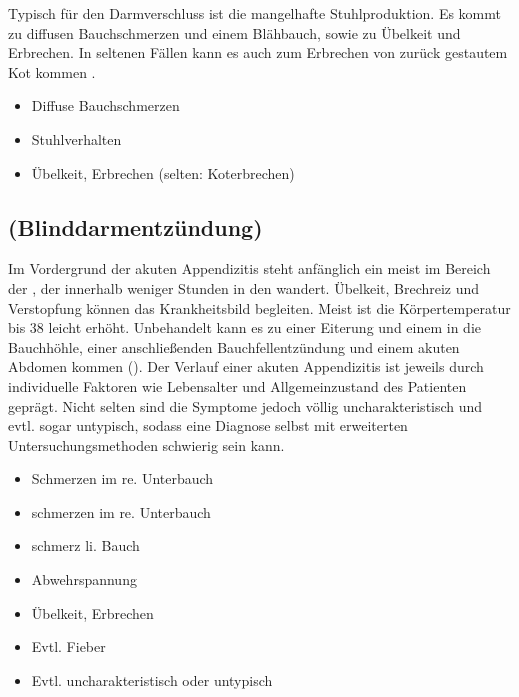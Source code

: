 \TextSlide{\TxSymptome}
{%
Typisch für den Darmverschluss ist die mangelhafte
Stuhlproduktion. Es kommt zu diffusen Bauchschmerzen und einem
Blähbauch, sowie zu Übelkeit und Erbrechen. In seltenen
Fällen kann es auch zum Erbrechen von zurück
gestautem Kot kommen .

\bigskip

}{
\begin{itemize}
  \item Diffuse Bauchschmerzen
  \item Stuhlverhalten
  \item Übelkeit, Erbrechen (selten: Koterbrechen)
\end{itemize}
}{}{}{}





\subsection{ (Blinddarmentzündung)}
\label{topic:appendizitis}%




{%
Im Vordergrund der akuten Appendizitis
steht anfänglich  ein meist  im Bereich der
, der
innerhalb weniger Stunden in den 
wandert. Übelkeit, Brechreiz und Verstopfung können
das Krankheitsbild begleiten. Meist ist die Körpertemperatur
bis 38\DegC{} leicht erhöht. 
Unbehandelt kann es zu einer
Eiterung und einem  in die Bauchhöhle, einer
anschließenden Bauchfellentzündung und einem akuten Abdomen
kommen ().
Der Verlauf einer akuten Appendizitis ist jeweils durch
individuelle Faktoren wie Lebensalter und Allgemeinzustand
des Patienten geprägt. Nicht selten sind die Symptome jedoch
völlig uncharakteristisch und evtl. sogar untypisch, sodass
eine Diagnose selbst mit erweiterten Untersuchungsmethoden
schwierig sein kann.

}{
\begin{itemize}
  \item Schmerzen im re. Unterbauch
  \item {}schmerzen im re. Unterbauch
  \item {}schmerz li. Bauch
  \item Abwehrspannung
  \item Übelkeit, Erbrechen
  \item Evtl. Fieber
  \item Evtl. uncharakteristisch oder untypisch
\end{itemize}
}{}{}{}





